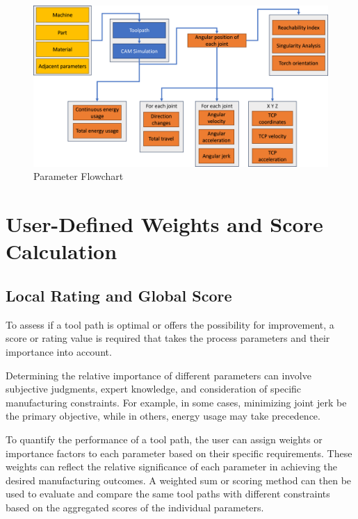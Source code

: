 \begin{figure}[H]
	\centerline{\includegraphics[scale=.5]{figures/Flow.png}}
	\caption{Parameter Flowchart}
	\label{ParamsFlow}
\end{figure}

\newpage

\section{User-Defined Weights and Score Calculation}\label{weights}
\subsection{Local Rating and Global Score}
To assess if a tool path is optimal or offers the possibility for improvement, a score or rating value is required that takes the process parameters and their importance into account. 

Determining the relative importance of different parameters can involve subjective judgments, expert knowledge, and consideration of specific manufacturing constraints. For example, in some cases, minimizing joint jerk be the primary objective, while in others, energy usage may take precedence.

To quantify the performance of a tool path, the user can assign weights or importance factors to each parameter based on their specific requirements. These weights can reflect the relative significance of each parameter in achieving the desired manufacturing outcomes. A weighted sum or scoring method can then be used to evaluate and compare the same tool paths with different constraints based on the aggregated scores of the individual parameters. %

